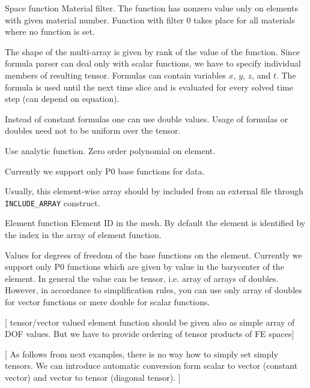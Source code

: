 \documentclass[12pt,a4paper]{report}
\begin{document}
\begin{recordtype}{Space function}{}
Material filter. The function has nonzero value only on elements with given material number. 
Function with filter $0$ takes place for all materials where no function is set.

The shape of the multi-array is given by 
rank of the value of the function. Since formula parser can deal only with scalar functions, we
have to specify individual members of resulting tensor. Formulas can contain variables $x$, $y$, $z$, and $t$. 
The formula is used until the next time slice and is evaluated for every solved time step (can depend on equation).

Instead of constant formulas one can use double values.
Usage of formulas or doubles need not to be uniform over the tensor.


   Use analytic function.
   Zero order polynomial on element.

Currently we support only P0 base functions for data.

Usually, this element-wise array should by included from an external file through \verb'INCLUDE_ARRAY' construct.

\end{recordtype}

\begin{recordtype}{Element function}{}
Element ID in the mesh. By default the element is 
identified by the index in the array of element function.

Values for degrees of freedom of the base functions on the element. Currently we support 
only P0 functions which are given by value in the barycenter of the element. 
In general the value can be tensor, i.e. array of arrays of doubles.
However, in accordance to simplification rules, you can use only array of doubles for 
vector functions or mere double for scalar functions.
\end{recordtype}

[ tensor/vector valued element function should be given also as simple array of DOF values. But
  we have to provide ordering of tensor products of FE spaces]

[ As follows from next examples, there is no way how to simply set simply tensors.  We can introduce automatic conversion form scalar to  vector (constant vector) and vector to tensor 
(diagonal tensor). ]
\end{document}
